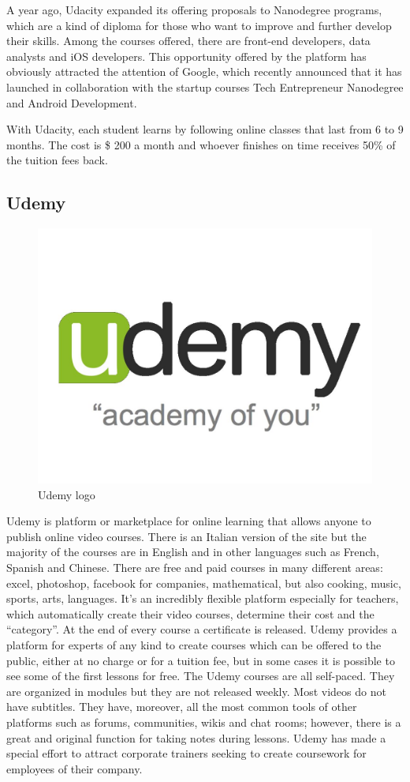 A year ago, Udacity expanded its offering proposals to Nanodegree programs, which are a kind of diploma for those who want to improve and further develop their skills. Among the courses offered, there are front-end developers, data analysts and iOS developers. This opportunity offered by the platform has obviously attracted the attention of Google, which recently announced that it has launched in collaboration with the startup courses Tech Entrepreneur Nanodegree and Android Development.

With Udacity, each student learns by following online classes that last from 6 to 9 months. The cost is \$ 200 a month and whoever finishes on time receives 50\% of the tuition fees back.



\subsection{Udemy}
\label{subsec:udemy}
\begin{figure}[htb] %
 \centering
 \includegraphics[width=0.5\linewidth]{images/chapter1/udemy.jpg}\hfill
 \caption[Udemy logo]{Udemy logo}
 \label{fig:fourV}
\end{figure}

Udemy is platform or marketplace for online learning that allows anyone to publish online video  courses. There is an Italian version of the site but the majority of the courses are in English and in other languages such as French, Spanish and Chinese.
There are free and paid courses in many different areas: excel, photoshop, facebook for companies, mathematical, but also cooking, music, sports, arts, languages.
It's an incredibly flexible platform especially for teachers, which automatically create their video courses, determine their cost and the “category”.
At the end of every course a certificate is released. Udemy provides a platform for experts of any kind to create courses which can be offered to the public, either at no charge or for a tuition fee, but in some cases it is possible to see some of the first lessons for free.
The Udemy courses are all self-paced. They are organized in modules but they are not released weekly. Most videos do not have subtitles. They have, moreover, all the most common tools of other platforms such as forums, communities, wikis and chat rooms; however, there is a great and original function for taking notes during lessons.
Udemy has made a special effort to attract corporate trainers seeking to create coursework for employees of their company.\cite{mooc_udemy}